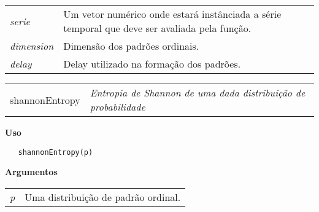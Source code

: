 \begin{table}[!ht]
\begin{center}
\begin{tabularx}{\textwidth}{X X}
\hspace{0.5cm} \textit{serie} \vspace{0.5cm}& Um vetor numérico onde estará instânciada a série temporal que deve ser avaliada pela função.\vspace{0.5cm}\\
\hspace{0.5cm} \textit{dimension} \vspace{0.5cm}& Dimensão dos padrões ordinais.\vspace{0.5cm}\\
\hspace{0.5cm} \textit{delay} & Delay utilizado na formação dos padrões.\\
\end{tabularx}
\end{center}
\end{table} 


\hrulefill   

\begin{table}[!ht]
\begin{center}
\begin{tabularx}{\textwidth}{ X X}
  \hspace{0.5cm} shannonEntropy & \textit{Entropia de Shannon de uma dada distribuição de probabilidade}\\
\end{tabularx}
\end{center}
\end{table} 

\vspace{-0.5cm}

\hrulefill  

\vspace{0.5cm}

\textbf{Uso}

\begin{lstlisting}
   shannonEntropy(p)
\end{lstlisting}

\vspace{0.5cm}

\textbf{Argumentos}

\begin{table}[!ht]
\begin{center}
\begin{tabularx}{\textwidth}{X X}
\hspace{0.5cm} \textit{p} & Uma distribuição de padrão ordinal.\\
\end{tabularx}
\end{center}
\end{table} 

